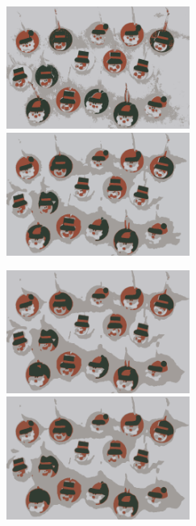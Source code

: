 \begin{center}
\begin{figure}[H]
\centering\includegraphics[width=6cm]{./imgkmeanscluster04-00.png}
\centering\includegraphics[width=6cm]{./imgkmeanscluster04-01.png}\\
\end{figure}
\end{center}
\begin{center}
\begin{figure}[H]
\centering\includegraphics[width=6cm]{./imgkmeanscluster04-02.png}
\centering\includegraphics[width=6cm]{./imgkmeanscluster04-03.png}\\
\end{figure}
\end{center}
